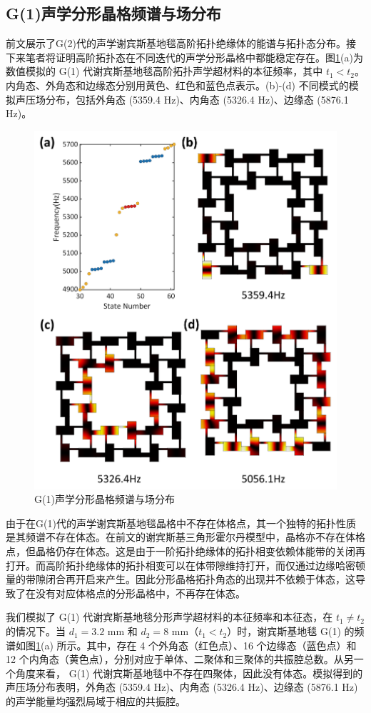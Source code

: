 \subsection{G(1)声学分形晶格频谱与场分布}
前文展示了G(2)代的声学谢宾斯基地毯高阶拓扑绝缘体的能谱与拓扑态分布。接下来笔者将证明高阶拓扑态在不同迭代的声学分形晶格中都能稳定存在。图\ref{fig:G1}(a)为 数值模拟的 G(1) 代谢宾斯基地毯高阶拓扑声学超材料的本征频率，其中 \( t_1 < t_2 \)。内角态、外角态和边缘态分别用黄色、红色和蓝色点表示。(b)-(d) 不同模式的模拟声压场分布，包括外角态 (5359.4 Hz)、内角态 (5326.4 Hz)、边缘态 (5876.1 Hz)。

\begin{figure}[htbp]
    \centering
    \includegraphics[width=0.5\linewidth]{figure/HOTIExp/G1.png}
    \caption{G(1)声学分形晶格频谱与场分布}
    \label{fig:G1}
\end{figure}

由于在G(1)代的声学谢宾斯基地毯晶格中不存在体格点，其一个独特的拓扑性质是其频谱不存在体态。在前文的谢宾斯基三角形霍尔丹模型中，晶格亦不存在体格点，但晶格仍存在体态。这是由于一阶拓扑绝缘体的拓扑相变依赖体能带的关闭再打开。而高阶拓扑绝缘体的拓扑相变可以在体带隙维持打开，而仅通过边缘哈密顿量的带隙闭合再开启来产生\cite{ezawa2020edge,khalaf2021boundary}。因此分形晶格拓扑角态的出现并不依赖于体态，这导致了在没有对应体格点的分形晶格中，不再存在体态。

我们模拟了 G(1) 代谢宾斯基地毯分形声学超材料的本征频率和本征态，在 \( t_1 \neq t_2 \) 的情况下。当 \( d_1 = 3.2 \) mm 和 \( d_2 = 8 \) mm（\( t_1 < t_2 \)）时，谢宾斯基地毯 G(1) 的频谱如图\ref{fig:G1}(a) 所示。其中，存在 4 个外角态（红色点）、16 个边缘态（蓝色点）和 12 个内角态（黄色点），分别对应于单体、二聚体和三聚体的共振腔总数。从另一个角度来看， G(1) 代谢宾斯基地毯中不存在四聚体，因此没有体态。模拟得到的声压场分布表明，外角态 (5359.4 Hz)、内角态 (5326.4 Hz)、边缘态 (5876.1 Hz)的声学能量均强烈局域于相应的共振腔。

